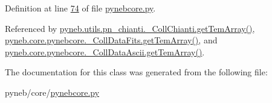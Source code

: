 Definition at line \hyperlink{pynebcore_8py_source_l00074}{74} of file \hyperlink{pynebcore_8py_source}{pynebcore.\+py}.



Referenced by \hyperlink{pn__chianti_8py_source_l00521}{pyneb.\+utils.\+pn\+\_\+chianti.\+\_\+\+Coll\+Chianti.\+get\+Tem\+Array()}, \hyperlink{pynebcore_8py_source_l00880}{pyneb.\+core.\+pynebcore.\+\_\+\+Coll\+Data\+Fits.\+get\+Tem\+Array()}, and \hyperlink{pynebcore_8py_source_l01110}{pyneb.\+core.\+pynebcore.\+\_\+\+Coll\+Data\+Ascii.\+get\+Tem\+Array()}.



The documentation for this class was generated from the following file\+:\begin{DoxyCompactItemize}
\item 
pyneb/core/\hyperlink{pynebcore_8py}{pynebcore.\+py}\end{DoxyCompactItemize}
